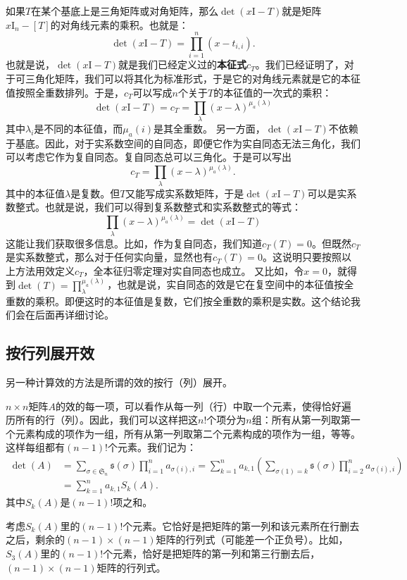\documentclass[12pt,UTF8]{ctexbook}
\begin{document}
如果$T$在某个基底上是三角矩阵或对角矩阵，那么$\det(x \mathrm{I} - T)$就是矩阵$x\mathrm{I}_n - [T]$的对角线元素的乘积。也就是：
$$
\det(x \mathrm{I} - T) = \prod_{i=1}^n (x - t_{i,i}).
$$
也就是说，$\det(x \mathrm{I} - T)$就是我们已经定义过的\textbf{本征式}$c_T$。我们已经证明了，对于可三角化矩阵，我们可以将其化为标准形式，于是它的对角线元素就是它的本征值按照全重数排列。于是，$c_T$可以写成$n$个关于$T$的本征值的一次式的乘积：
$$
\det(x \mathrm{I} - T) = c_T = \prod_{\lambda} (x - \lambda)^{\mu_a(\lambda)}
$$
其中$\lambda_i$是不同的本征值，而$\mu_a(i)$是其全重数。
另一方面，$\det(x \mathrm{I} - T)$不依赖于基底。因此，对于实系数空间的自同态，即便它作为实自同态无法三角化，我们可以考虑它作为复自同态。复自同态总可以三角化。于是可以写出
$$c_T = \prod_{\lambda} (x - \lambda)^{\mu_a(\lambda)}.$$
其中的本征值$\lambda$是复数。但$T$又能写成实系数矩阵，于是$\det(x \mathrm{I} - T)$可以是实系数整式。也就是说，我们可以得到复系数整式和实系数整式的等式：
$$ \prod_{\lambda} (x - \lambda)^{\mu_a(\lambda)} = \det(x \mathrm{I} - T) $$
这能让我们获取很多信息。比如，作为复自同态，我们知道$c_T(T) = 0$。但既然$c_T$是实系数整式，那么对于任何实向量，显然也有$c_T(T) = 0$。这说明只要按照以上方法用效定义$c_T$，全本征归零定理对实自同态也成立。
又比如，令$x = 0$，就得到$\det(T) = \prod_{\lambda}^{\mu_a(\lambda)}$，也就是说，实自同态的效是它在复空间中的本征值按全重数的乘积。即便这时的本征值是复数，它们按全重数的乘积是实数。这个结论我们会在后面再详细讨论。

\subsection{按行列展开效}
另一种计算效的方法是所谓的效的按行（列）展开。

$n\times n$矩阵$A$的效的每一项，可以看作从每一列（行）中取一个元素，使得恰好遍历所有的行（列）。因此，我们可以这样把这$n!$个项分为$n$组：所有从第一列取第一个元素构成的项作为一组，所有从第一列取第二个元素构成的项作为一组，等等。这样每组都有$(n-1)!$个元素。我们记为：
\begin{align*}
    \det(A) &= \sum_{\sigma\in\mathfrak{S}_n} \mathfrak{s}(\sigma) \prod_{i=1}^n a_{\sigma(i),i} = \sum_{k=1}^n a_{k,1}\left( \sum_{\sigma(1)=k} \mathfrak{s}(\sigma) \prod_{i=2}^n a_{\sigma(i),i}\right) \\
    &= \sum_{k=1}^n a_{k,1} S_k(A).
\end{align*}
其中$S_k(A)$是$(n-1)!$项之和。

考虑$S_k(A)$里的$(n-1)!$个元素。它恰好是把矩阵的第一列和该元素所在行删去之后，剩余的$(n-1)\times (n-1)$矩阵的行列式（可能差一个正负号）。比如，$S_3(A)$里的$(n-1)!$个元素，恰好是把矩阵的第一列和第三行删去后，$(n-1)\times (n-1)$矩阵的行列式。
\end{document}
